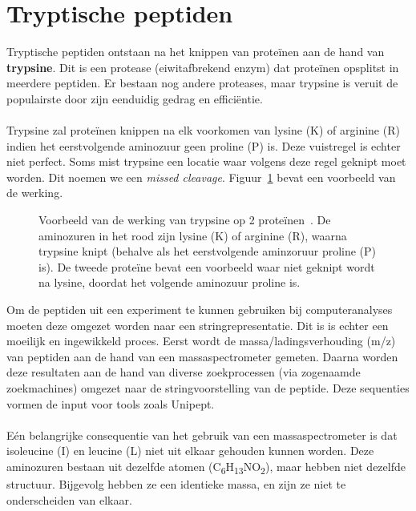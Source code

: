 \section{Tryptische peptiden}\label{sec:tryptische-peptiden}
Tryptische peptiden ontstaan na het knippen van proteïnen aan de hand van \textbf{trypsine}.
Dit is een protease (eiwitafbrekend enzym) dat proteïnen opsplitst in meerdere peptiden.
Er bestaan nog andere proteases, maar trypsine is veruit de populairste door zijn eenduidig gedrag en efficiëntie.
\\ \\
Trypsine zal proteïnen knippen na elk voorkomen van lysine (K) of arginine (R) indien het eerstvolgende aminozuur geen proline (P) is.
Deze vuistregel is echter niet perfect.
Soms mist trypsine een locatie waar volgens deze regel geknipt moet worden.
Dit noemen we een \textit{missed cleavage}.
Figuur~\ref{fig:trypsine} bevat een voorbeeld van de werking.

\begin{figure}[H]
    \centering
    
    \caption{Voorbeeld van de werking van trypsine op 2 proteïnen~\cite{phdPieterUnipept}. De aminozuren in het rood zijn lysine (K) of arginine (R), waarna trypsine knipt (behalve als het eerstvolgende aminzoruur proline (P) is). De tweede proteïne bevat een voorbeeld waar niet geknipt wordt na lysine, doordat het volgende aminozuur proline is.}
    \label{fig:trypsine}
\end{figure}

Om de peptiden uit een experiment te kunnen gebruiken bij computeranalyses moeten deze omgezet worden naar een stringrepresentatie.
Dit is is echter een moeilijk en ingewikkeld proces.
Eerst wordt de massa/ladingsverhouding (m/z) van peptiden aan de hand van een massaspectrometer gemeten.
Daarna worden deze resultaten aan de hand van diverse zoekprocessen (via zogenaamde zoekmachines) omgezet naar de stringvoorstelling van de peptide.
Deze sequenties vormen de input voor tools zoals Unipept.
\\ \\
Eén belangrijke consequentie van het gebruik van een massaspectrometer is dat isoleucine (I) en leucine (L) niet uit elkaar gehouden kunnen worden.
Deze aminozuren bestaan uit dezelfde atomen (C\textsubscript{6}H\textsubscript{13}NO\textsubscript{2}), maar hebben niet dezelfde structuur.
Bijgevolg hebben ze een identieke massa, en zijn ze niet te onderscheiden van elkaar.


